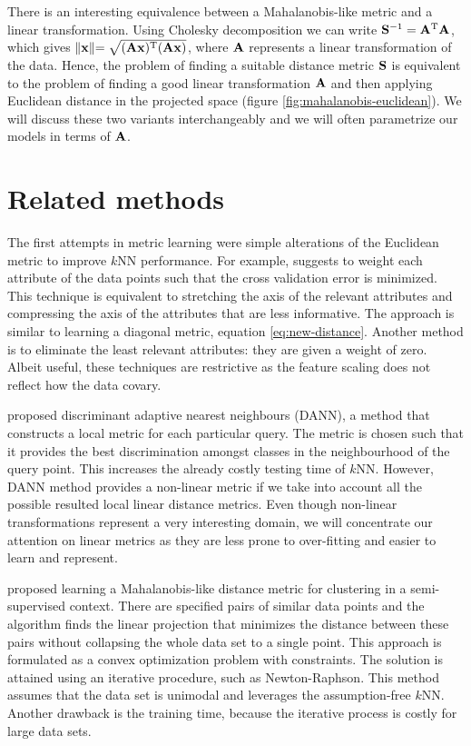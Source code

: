 There is an interesting equivalence between a Mahalanobis-like metric and a linear transformation. Using Cholesky decomposition we can write $\mathbf{S}^{-1}=\mathbf{A}^\textrm{T}\mathbf{A}$, which gives $\lVert \mathbf{x} \lVert = \sqrt{(\mathbf{A}\mathbf{x})^\textrm{T}(\mathbf{A}\mathbf{x})}$, where $\mathbf{A}$ represents a linear transformation of the data. Hence, the problem of finding a suitable distance metric $\mathbf{S}$ is equivalent to the problem of finding a good linear transformation $\mathbf{A}$ and then applying Euclidean distance in the projected space (figure \ref{fig:mahalanobis-euclidean}). We will discuss these two variants interchangeably and we will often parametrize our models in terms of $\mathbf{A}$.

\section{Related methods}
\label{sec:related-methods}

The first attempts in metric learning were simple alterations of the Euclidean metric to improve $k$NN performance. For example, \citet{mitchell1997} suggests to weight each attribute of the data points such that the cross validation error is minimized. This technique is equivalent to stretching the axis of the relevant attributes and compressing the axis of the attributes that are less informative. The approach is similar to learning a diagonal metric, equation \eqref{eq:new-distance}. Another method \citep{moore1994} is to eliminate the least relevant attributes: they are given a weight of zero. Albeit useful, these techniques are restrictive as the feature scaling does not reflect how the data covary.

\citet{hastie1996} proposed discriminant adaptive nearest neighbours (DANN), a method that constructs a local metric for each particular query. The metric is chosen such that it provides the best discrimination amongst classes in the neighbourhood of the query point. This increases the already costly testing time of $k$NN. However, DANN method provides a non-linear metric if we take into account all the possible resulted local linear distance metrics. Even though non-linear transformations represent a very interesting domain, we will concentrate our attention on linear metrics as they are less prone to over-fitting and easier to learn and represent.

\citet{xing2003} proposed learning a Mahalanobis-like distance metric for clustering in a semi-supervised context. There are specified pairs of similar data points and the algorithm finds the linear projection that minimizes the distance between these pairs without collapsing the whole data set to a single point. This approach is formulated as a convex optimization problem with constraints. The solution is attained using an iterative procedure, such as Newton-Raphson. This method assumes that the data set is unimodal and leverages the assumption-free $k$NN. Another drawback is the training time, because the iterative process is costly for large data sets.

